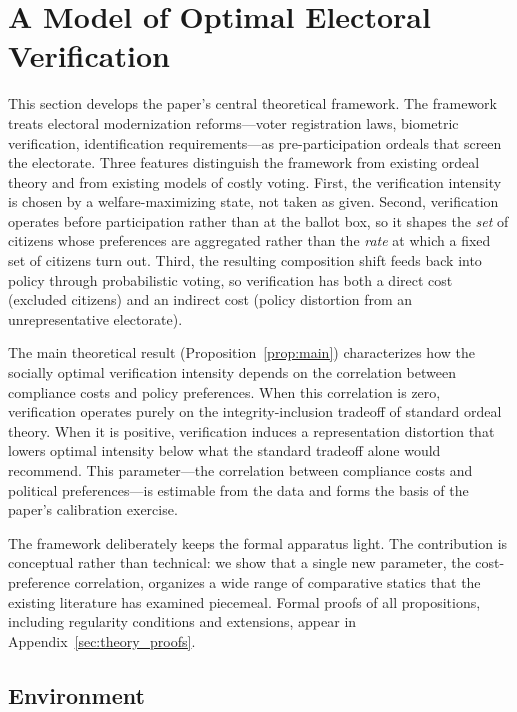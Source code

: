 \section{A Model of Optimal Electoral Verification}
\label{sec:theory}

This section develops the paper's central theoretical framework. The framework treats electoral modernization reforms---voter registration laws, biometric verification, identification requirements---as pre-participation ordeals that screen the electorate. Three features distinguish the framework from existing ordeal theory and from existing models of costly voting. First, the verification intensity is chosen by a welfare-maximizing state, not taken as given. Second, verification operates before participation rather than at the ballot box, so it shapes the \emph{set} of citizens whose preferences are aggregated rather than the \emph{rate} at which a fixed set of citizens turn out. Third, the resulting composition shift feeds back into policy through probabilistic voting, so verification has both a direct cost (excluded citizens) and an indirect cost (policy distortion from an unrepresentative electorate).

The main theoretical result (Proposition~\ref{prop:main}) characterizes how the socially optimal verification intensity depends on the correlation between compliance costs and policy preferences. When this correlation is zero, verification operates purely on the integrity-inclusion tradeoff of standard ordeal theory. When it is positive, verification induces a representation distortion that lowers optimal intensity below what the standard tradeoff alone would recommend. This parameter---the correlation between compliance costs and political preferences---is estimable from the data and forms the basis of the paper's calibration exercise.

The framework deliberately keeps the formal apparatus light. The contribution is conceptual rather than technical: we show that a single new parameter, the cost-preference correlation, organizes a wide range of comparative statics that the existing literature has examined piecemeal. Formal proofs of all propositions, including regularity conditions and extensions, appear in Appendix~\ref{sec:theory_proofs}.

\subsection{Environment}
\label{ssec:environment}

